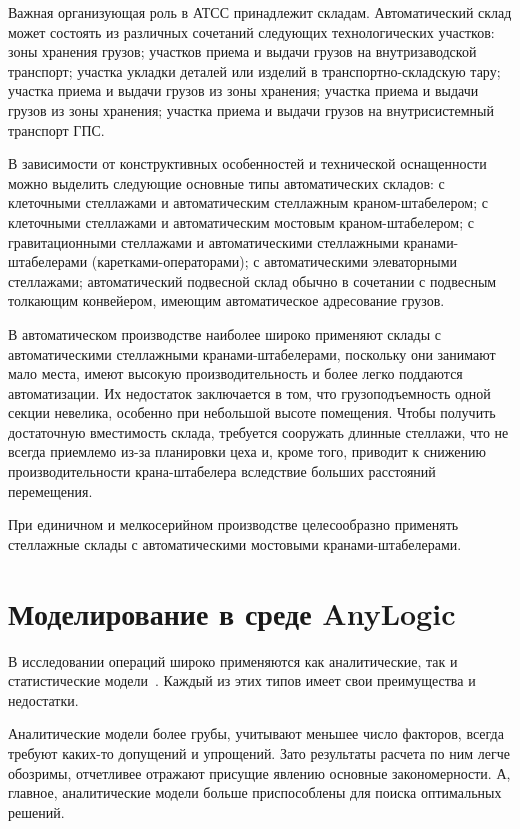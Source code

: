 Важная организующая роль в АТСС принадлежит складам. Автоматический склад может состоять из различных сочетаний следующих технологических участков: зоны хранения грузов; участков приема и выдачи грузов на внутризаводской транспорт; участка укладки деталей или изделий в транспортно-складскую тару; участка приема и выдачи грузов из зоны хранения; участка приема и выдачи грузов из зоны хранения; участка приема и выдачи грузов на внутрисистемный транспорт ГПС.

В зависимости от конструктивных особенностей и технической оснащенности можно выделить следующие основные типы автоматических складов: с клеточными стеллажами и автоматическим стеллажным краном-штабелером; с клеточными стеллажами и автоматическим мостовым краном-штабелером; с гравитационными стеллажами и автоматическими стеллажными кранами-штабелерами (каретками-операторами); с автоматическими элеваторными стеллажами; автоматический подвесной склад обычно в сочетании с подвесным толкающим конвейером, имеющим автоматическое адресование грузов.

В автоматическом производстве наиболее широко применяют склады с автоматическими стеллажными кранами-штабелерами, поскольку они занимают мало места, имеют высокую производительность и более легко поддаются автоматизации. Их недостаток заключается в том, что грузоподъемность одной секции невелика, особенно при небольшой высоте помещения. Чтобы получить достаточную вместимость склада, требуется сооружать длинные стеллажи, что не всегда приемлемо из-за планировки цеха и, кроме того, приводит к снижению производительности крана-штабелера вследствие больших расстояний перемещения.

При единичном и мелкосерийном производстве целесообразно применять стеллажные склады с автоматическими мостовыми кранами-штабелерами.

\section{Моделирование в среде AnyLogic}

В исследовании операций широко применяются как аналитические, так и статистические модели~\cite{ivn:service}. Каждый из этих типов имеет свои преимущества и недостатки.

Аналитические модели более грубы, учитывают меньшее число факторов, всегда требуют каких-то допущений и упрощений. Зато результаты расчета по ним легче обозримы, отчетливее отражают присущие явлению основные закономерности. А, главное, аналитические модели больше приспособлены для поиска оптимальных решений.


